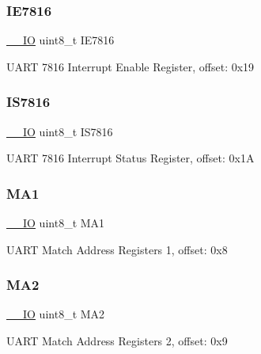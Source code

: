 \subsubsection{\texorpdfstring{IE7816}{IE7816}}
{\footnotesize\ttfamily \mbox{\hyperlink{core__cm0plus_8h_aec43007d9998a0a0e01faede4133d6be}{\+\_\+\+\_\+\+IO}} uint8\+\_\+t I\+E7816}

U\+A\+RT 7816 Interrupt Enable Register, offset\+: 0x19 \mbox{\label{struct_u_a_r_t___type_a53d4127ba86dcb65e9c60a5900fb5376}} 
\subsubsection{\texorpdfstring{IS7816}{IS7816}}
{\footnotesize\ttfamily \mbox{\hyperlink{core__cm0plus_8h_aec43007d9998a0a0e01faede4133d6be}{\+\_\+\+\_\+\+IO}} uint8\+\_\+t I\+S7816}

U\+A\+RT 7816 Interrupt Status Register, offset\+: 0x1A \mbox{\label{struct_u_a_r_t___type_a87caead6e07d105afdea1716b3f1f152}} 
\subsubsection{\texorpdfstring{MA1}{MA1}}
{\footnotesize\ttfamily \mbox{\hyperlink{core__cm0plus_8h_aec43007d9998a0a0e01faede4133d6be}{\+\_\+\+\_\+\+IO}} uint8\+\_\+t M\+A1}

U\+A\+RT Match Address Registers 1, offset\+: 0x8 \mbox{\label{struct_u_a_r_t___type_a09350a7ee6276cea8738dc77ad2049e3}} 
\subsubsection{\texorpdfstring{MA2}{MA2}}
{\footnotesize\ttfamily \mbox{\hyperlink{core__cm0plus_8h_aec43007d9998a0a0e01faede4133d6be}{\+\_\+\+\_\+\+IO}} uint8\+\_\+t M\+A2}

U\+A\+RT Match Address Registers 2, offset\+: 0x9 \mbox{\label{struct_u_a_r_t___type_ac4e320927bd72445c49414603b05f792}} 
